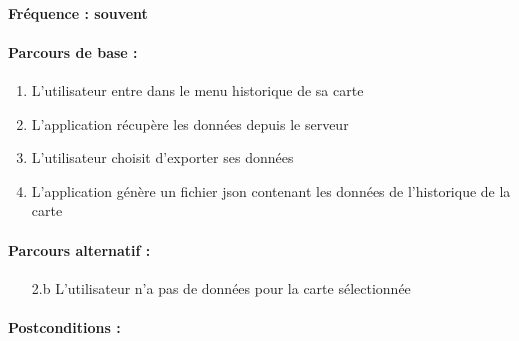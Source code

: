 \documentclass[../annexe.tex]{subfiles}
\begin{document}
\paragraph{Fréquence : souvent}
\paragraph{Parcours de base :}
\begin{enumerate}
	\item{L'utilisateur entre dans le menu historique de sa carte}
	\item{L'application récupère les données depuis le serveur}
	\item{L'utilisateur choisit d'exporter ses données}
	\item{L'application génère un fichier json contenant les données de l'historique de la carte}
\end{enumerate}
\paragraph{Parcours alternatif :}
\begin{itemize}
	\item[2.b]{L'utilisateur n'a pas de données pour la carte sélectionnée}
\end{itemize}
\paragraph{Postconditions :}
\end{document}
